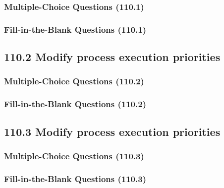 \documentclass[a4paper]{report}
\begin{document}
\subsubsection*{Multiple-Choice Questions (110.1)}

\subsubsection*{Fill-in-the-Blank Questions (110.1)}

\subsection*{110.2 Modify process execution priorities}
\subsubsection*{Multiple-Choice Questions (110.2)}

\subsubsection*{Fill-in-the-Blank Questions (110.2)}

\subsection*{110.3 Modify process execution priorities}
\subsubsection*{Multiple-Choice Questions (110.3)}

\subsubsection*{Fill-in-the-Blank Questions (110.3)}
\end{document}
